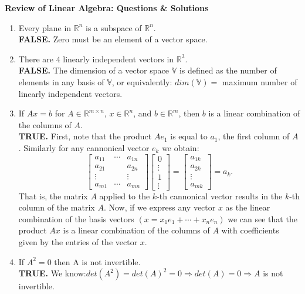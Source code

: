 \documentclass[14pt]{report}
\begin{document}
\textbf{{Review of Linear Algebra: Questions \& Solutions}}\\
\thispagestyle{empty}


\begin{enumerate}
\item Every plane in $\mathbb{R}^n$ is a subspace of $\mathbb{R}^n$.\\
\textbf{FALSE.}  Zero must be an element of a vector space. 

\item There are $4$ linearly independent vectors in $\mathbb{R}^3$. \\
\textbf{FALSE.} The dimension of a vector space $\mathbb{V}$
  is defined as the number of elements in any basis of $\mathbb{V}$, or
  equivalently: $dim(\mathbb{V})=$ maximum number of linearly independent
  vectors.

\item If $Ax=b$ for $A \in \mathbb{R}^{m\times n}$, $x\in\mathbb{R}^n$, and
  $b\in\mathbb{R}^m$, then $b$ is a linear combination of the columns of $A$.\\
  \textbf{TRUE.} First, note that the product
  $Ae_1$ is equal to $a_1$, the first column of $A$.
  Similarly for any cannonical vector $e_k$ we obtain:
\[\left[\begin{array}{ccc}a_{11}&\cdots&a_{1n}\\a_{21}&&a_{2n}\\\vdots&&\vdots\\a_{m1}&\cdots&a_{mn}\end{array}\right]\left[\begin{array}{c}0\\\vdots\\1\\\vdots\end{array}\right]=\left[\begin{array}{c}a_{1k}\\a_{2k}\\\vdots\\a_{mk}\end{array}\right]=a_k.\]
        That is, the matrix $A$ applied to the $k$-th cannonical vector results
        in the $k$-th column of the matrix $A$. Now, if we express any vector
        $x$ as the linear combination of the basis vectors
        $(x=x_1e_1+\cdots+x_ne_n)$ we can see that the product $Ax$ is a
        linear combination of the columns of $A$ with coefficients given by
        the entries of the vector $x$. 

\item If $A^2=0$ then A is not invertible.\\
  \textbf{TRUE.} We know:$det(A^2)=det(A)^2=0\Rightarrow det(A)=0\Rightarrow A$
  is not invertible.



\end{enumerate}
\end{document}
